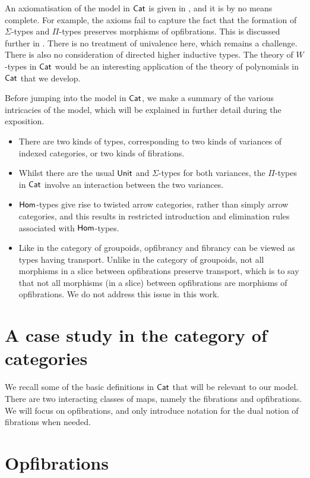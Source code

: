 An axiomatisation of the model in $\mathsf{Cat}$ is given in ,
and it is by no means complete.
For example, the axioms fail to capture the fact that
the formation of $\Sigma$-types and $\Pi$-types
preserves morphisms of opfibrations.
This is discussed further in .
There is no treatment of univalence here,
which remains a challenge.
There is also no consideration of directed higher inductive types.
The theory of $W$-types in $\mathsf{Cat}$
would be an interesting application of the theory of polynomials in $\mathsf{Cat}$
that we develop.

Before jumping into the model in $\mathsf{Cat}$,
we make a summary of the various intricacies of the model,
which will be explained in further detail during the exposition.
\begin{itemize}
  \item There are two kinds of types,
    corresponding to two kinds of variances of indexed categories,
    or two kinds of fibrations.
  \item Whilst there are the usual $\mathsf{Unit}$ and $\Sigma$-types for both variances,
    the $\Pi$-types in $\mathsf{Cat}$ involve an interaction between the two variances.
  \item $\mathsf{Hom}$-types give rise to twisted arrow categories,
    rather than simply arrow categories,
    and this results in restricted introduction and elimination rules
    associated with $\mathsf{Hom}$-types.
  \item Like in the category of groupoids,
    opfibrancy and fibrancy can be viewed as types having transport.
    Unlike in the category of groupoids,
    not all morphisms in a slice between opfibrations preserve transport,
    which is to say that not all morphisms (in a slice) between opfibrations
    are morphisms of opfibrations.
    We do not address this issue in this work.
\end{itemize}

\section{A case study in the category of categories}
\label{sec:preliminaries}
We recall some of the basic definitions in $\mathsf{Cat}$
that will be relevant to our model.
There are two interacting classes of maps,
namely the fibrations and opfibrations.
We will focus on opfibrations,
and only introduce notation for the dual notion of
fibrations when needed.

\section*{Opfibrations}

